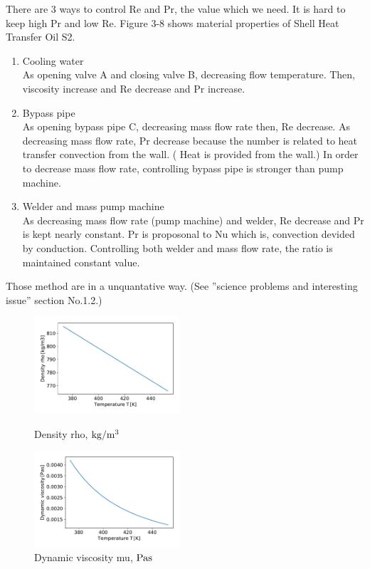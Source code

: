 \documentclass[conference]{IEEEtran}
\begin{document}
There are 3 ways to control Re and Pr, the value which we need.
It is hard to keep high Pr and low Re.
Figure 3-8 shows material properties of Shell Heat Transfer Oil S2.

\begin{enumerate}
  \item Cooling water\\
  As opening valve A and closing valve B, decreasing flow temperature.
  Then, viscosity increase and Re decrease and Pr increase.
  \item Bypass pipe\\
  As opening bypass pipe C, decreasing mass flow rate then, Re decrease.
  As decreasing mass flow rate, Pr decrease because the number is related to heat transfer convection from the wall. ( Heat is provided from the wall.)
  In order to decrease mass flow rate, controlling bypass pipe is stronger than pump machine.
  \item Welder and mass pump machine\\
  As decreasing mass flow rate (pump machine) and welder, Re decrease and Pr is kept nearly constant.
  Pr is proposonal to Nu which is, convection devided by conduction.
  Controlling both welder and mass flow rate, the ratio is maintained constant value.
\end{enumerate}
Those method are in a unquantative way.
(See ''science problems and interesting issue'' section No.1.2.)

\begin{figure}[h]
\vspace{3zh}
\begin{minipage}{0.48\linewidth}
 \includegraphics[width=0.48\textwidth,natwidth=200,natheight=220]{fig/density_rho.pdf}
 \vspace{-1.5zh}
 \caption{Density rho, $\rm kg/m^{3}$}\label{density_rho}
\end{minipage}
\hfill
\begin{minipage}{0.48\linewidth}
 \includegraphics[width=0.48\textwidth,natwidth=190,natheight=210]{fig/dynamic_viscosity.pdf}
 \vspace{-1.5zh}
 \caption{Dynamic viscosity mu, $\rm Pa s$}\label{dynamic_viscosity}
\end{minipage}
\vspace{2zh}
\end{figure}
\end{document}
